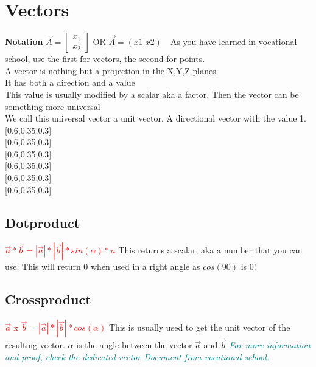 \documentclass[main.tex,fontsize=8pt,paper=a4,paper=portrait,DIV=calc,]{scrartcl}
\begin{document}
\begin{table}[!ht]
\section{Vectors}
\textbf{Notation} \( \vec{A} = \begin{bmatrix}x_{1} \\ x_{2} \end{bmatrix} \) OR \(\vec{A} = (x1 | x2)\)
\,   \,As you have learned in vocational school, use the first for vectors, the second for points.\\
{A vector is nothing but a projection in the X,Y,Z planes \\ 
It has both a direction and a value\\
This value is usually modified by a scalar aka a factor. Then the vector can be something more universal \\
We call this universal vector a unit vector. A directional vector with the value 1.}[0.6,0.35,0.3]\\
[0.6,0.35,0.3]\\
[0.6,0.35,0.3]\\
[0.6,0.35,0.3]\\
[0.6,0.35,0.3]\\
[0.6,0.35,0.3]\\
\subsection{Dotproduct}
\Large{\textbf{\textcolor{red}{\( \vec{a} * \vec{b} = |\vec{a}| * |\vec{b}| * sin(\alpha) * n \)}}}\newline
\normalsize This returns a scalar, aka a number that you can use.\newline
This will return 0 when used in a right angle as \(cos(90)\) is 0!\\
\subsection{Crossproduct}
\Large{\textbf{\textcolor{red}{\( \vec{a} \text{ x } \vec{b} = |\vec{a}| * |\vec{b}| * cos(\alpha) \)}}}\newline
\normalsize This is usually used to get the unit vector of the resulting vector.\newline
\(\alpha\) is the angle between the vector \(\vec{a}\) and \(\vec{b}\)\newline
\emph{\textcolor{teal}{For more information and proof, check the dedicated vector Document from vocational school.}}\\
\end{table}
\end{document}
